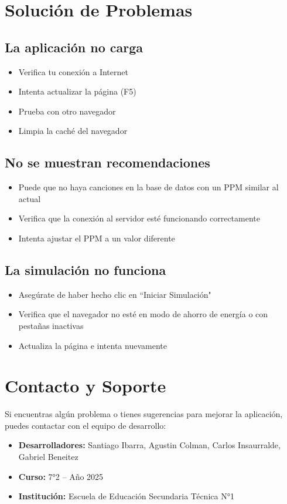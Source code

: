 \documentclass[a4paper,12pt]{article}
\begin{document}
\section{Solución de Problemas}

\subsection{La aplicación no carga}
\begin{itemize}
    \item Verifica tu conexión a Internet
    \item Intenta actualizar la página (F5)
    \item Prueba con otro navegador
    \item Limpia la caché del navegador
\end{itemize}

\subsection{No se muestran recomendaciones}
\begin{itemize}
    \item Puede que no haya canciones en la base de datos con un PPM similar al actual
    \item Verifica que la conexión al servidor esté funcionando correctamente
    \item Intenta ajustar el PPM a un valor diferente
\end{itemize}

\subsection{La simulación no funciona}
\begin{itemize}
    \item Asegúrate de haber hecho clic en ``Iniciar Simulación"
    \item Verifica que el navegador no esté en modo de ahorro de energía o con pestañas inactivas
    \item Actualiza la página e intenta nuevamente
\end{itemize}

\section{Contacto y Soporte}
Si encuentras algún problema o tienes sugerencias para mejorar la aplicación, puedes contactar con el equipo de desarrollo:

\begin{itemize}
    \item \textbf{Desarrolladores:} Santiago Ibarra, Agustin Colman, Carlos Insaurralde, Gabriel Beneitez
    \item \textbf{Curso:} 7°2 -- Año 2025
    \item \textbf{Institución:} Escuela de Educación Secundaria Técnica N°1
\end{itemize}
\end{document}

